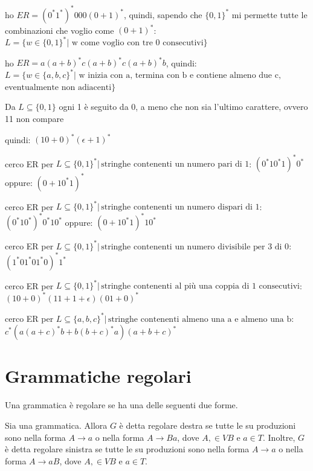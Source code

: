 \begin{example}
	ho $ER=(0^*1^*)^*000(0+1)^*$, quindi, sapendo che $\{0,1\}^*$ mi permette tutte le combinazioni che voglio come $(0+1)^*$:
	$L=\{w\in\{0,1\}^*|\text{ w come voglio con tre 0 consecutivi}\}$
\end{example}
\begin{example}
	ho $ER=a(a+b)^*c(a+b)^*c(a+b)^*b$, quindi:
	$L=\{w\in\{a,b,c\}^*|\text{ w inizia con a, termina con b  e contiene almeno due c, }$
	$\text{eventualmente non adiacenti}\}$
\end{example}
\begin{example}
Da $L\subseteq\{0,1\}$
 ogni 1 è seguito da 0, a meno che non sia l'ultimo carattere, ovvero 11 non compare

	quindi:
	$(10+0)^*(\epsilon+1)^*$
\end{example}
\begin{example}
	cerco ER per $L\subseteq\{0,1\}^*|\, \text{stringhe contenenti un numero pari di 1}$:
	$(0^*10^*1)^*0^*$
	oppure:
	$(0+10^*1)^*$
\end{example}
\begin{example}
	cerco ER per $L\subseteq\{0,1\}^*|\, \text{stringhe contenenti un numero dispari di 1}$:
	$(0^*10^*)^*0^*10^*$
	oppure:
	$(0+10^*1)^*10^*$
\end{example}
\begin{example}
	cerco ER per $L\subseteq\{0,1\}^*|\, \text{stringhe contenenti un numero divisibile per 3 di 0}$:
	$(1^*01^*01^*0)^*1^*$
\end{example}
\begin{example}
	cerco ER per $L\subseteq\{0,1\}^*|\, \text{stringhe contenenti al più una coppia di 1 consecutivi}$:
	$(10+0)^*(11+1+\epsilon)(01+0)^*$
\end{example}
\begin{example}
	cerco ER per $L\subseteq\{a,b,c\}^*|\, \text{stringhe contenenti almeno una a e almeno una b}:$
	$c^*\left(a(a+c)^*b+b(b+c)^*a\right)(a+b+c)^*$
\end{example}

\section{Grammatiche regolari}\label{sec:grammatiche-regolari}

Una grammatica è regolare se ha una delle seguenti due forme.


\begin{definition}\label{def:grammatica-regolare-destra}
Sia \gramm una grammatica.
Allora $G$ è detta regolare destra se tutte le su produzioni sono nella forma $A \to a$ o nella forma $A \to Ba$, dove
$A, \in VB$  e $a\in T$.
Inoltre, $G$ è detta regolare sinistra se tutte le su produzioni sono nella forma $A \to a$ o nella forma $A \to aB$, dove
$A, \in VB$  e $a\in T$.
\end{definition}


